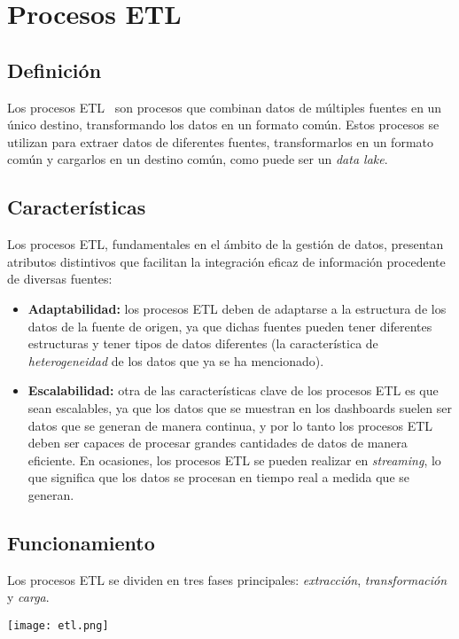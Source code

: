 \newpage{}
\section{Procesos ETL}\label{sec:etl}
\subsection{Definición}
Los procesos ETL~\cite{mier2023dashboards} son procesos que combinan datos de múltiples
fuentes en un único destino, transformando los datos en un formato común. Estos procesos
se utilizan para extraer datos de diferentes fuentes, transformarlos en un formato común
y cargarlos en un destino común, como puede ser un \textit{data lake}.

\subsection{Características}
Los procesos ETL, fundamentales en el ámbito de la gestión de datos, presentan atributos
distintivos que facilitan la integración eficaz de información procedente de diversas fuentes:

\begin{itemize}
	\item \textbf{Adaptabilidad:} los procesos ETL deben de adaptarse a la estructura de los
		datos de la fuente de origen, ya que dichas fuentes pueden tener diferentes estructuras
		y tener tipos de datos diferentes (la característica de \textit{heterogeneidad} de los
		datos que ya se ha mencionado).
	\item \textbf{Escalabilidad:} otra de las características clave de los procesos ETL es que sean
		escalables, ya que los datos que se muestran en los dashboards suelen ser datos que se generan
		de manera continua, y por lo tanto los procesos ETL deben ser capaces de procesar grandes
		cantidades de datos de manera eficiente. En ocasiones, los procesos ETL se pueden realizar en
		\textit{streaming}, lo que significa que los datos se procesan en tiempo real a medida que se
		generan.
\end{itemize}

\newpage{}
\subsection{Funcionamiento}
Los procesos ETL se dividen en tres fases principales: \textit{extracción}, \textit{transformación}
y \textit{carga}.

\begin{minipage}{\linewidth}
	\centering
	\texttt{[image: etl.png]}
\end{minipage}

